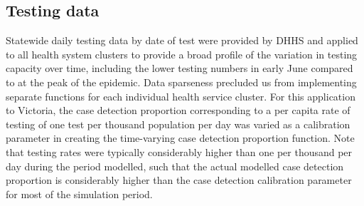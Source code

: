 \subsection{Testing data}
Statewide daily testing data by date of test were provided by DHHS and applied to all health system clusters to provide a broad profile of the variation in testing capacity over time, including the lower testing numbers in early June compared to at the peak of the epidemic. Data sparseness precluded us from implementing separate functions for each individual health service cluster. For this application to Victoria, the case detection proportion corresponding to a per capita rate of testing of one test per thousand population per day was varied as a calibration parameter in creating the time-varying case detection proportion function. Note that testing rates were typically considerably higher than one per thousand per day during the period modelled, such that the actual modelled case detection proportion is considerably higher than the case detection calibration parameter for most of the simulation period.